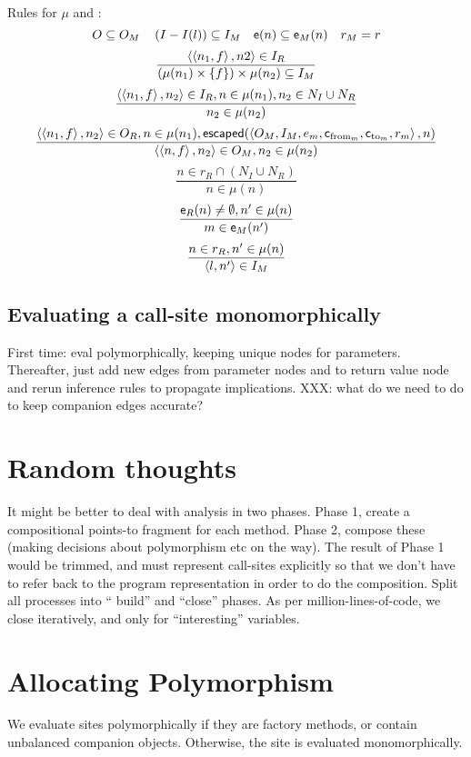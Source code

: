 \documentclass[11pt,notitlepage]{article}
\newcommand{\func}[1]{\ensuremath{\text{\sffamily #1}}}
\begin{document}
Rules for $\mu$ and 
\tuple{O_M, I_M, e_m, \func{c}_{\text{from}_m}, \func{c}_{\text{to}_m}, r_m}:
\[ O\subseteq O_M \quad
   \left(I-I(l)\right)\subseteq I_M \quad
   \func{e}(n)\subseteq\func{e}_M(n) \quad
   r_M = r %
\]
\[\dfrac
{\left\langle \left\langle n_1,f \right\rangle,n2 \right\rangle\in I_R}
{\left(\mu(n_1)\times\{f\}\right)\times\mu(n_2)\subseteq I_M}
\]
\[\dfrac
{\left\langle \left\langle n_1,f \right\rangle,n_2 \right\rangle\in I_R,
  n\in\mu(n_1),
  n_2\in N_I\cup N_R}
{n_2\in\mu(n_2)}
\]
\[\dfrac
{\tuple{\tuple{n_1,f},n_2}\in O_R,
 n\in\mu(n_1),
 \func{escaped}(
\tuple{O_M, I_M, e_m, \func{c}_{\text{from}_m}, \func{c}_{\text{to}_m}, r_m}
 ,n) }
{\tuple{\tuple{n,f},n_2}\in O_M,
 n_2\in\mu(n_2) }
\]
\[\dfrac
{n\in r_R\cap\left(N_I\cup N_R\right)}
{n\in\mu(n)}
\]
\[\dfrac
{\func{e}_R(n)\neq\emptyset,
 n'\in\mu(n)}
{m\in\func{e}_M(n')}
\]
\[\dfrac
{n\in r_R, n'\in\mu(n)}
{\left\langle l,n' \right\rangle\in I_M}
\]

\subsection{Evaluating a call-site monomorphically}

First time: eval polymorphically, keeping unique nodes for
parameters.  Thereafter, just add new edges from parameter nodes and
to return value node and rerun inference rules to propagate implications.
XXX: what do we need to do to keep companion edges accurate?

\section{Random thoughts}
It might be better to deal with analysis in two phases.  Phase 1,
create a compositional points-to fragment for each method.  Phase 2,
compose these (making decisions about polymorphism etc on the way).
The result of Phase 1 would be trimmed, and must represent call-sites
explicitly so that we don't have to refer back to the program
representation in order to do the composition.  Split all processes
into `` build'' and ``close'' phases.  As per million-lines-of-code,
we close iteratively, and only for ``interesting'' variables.

\section{Allocating Polymorphism}

We evaluate sites polymorphically if they are factory methods, or
contain unbalanced companion objects.  Otherwise, the site is
evaluated monomorphically.
\end{document}
